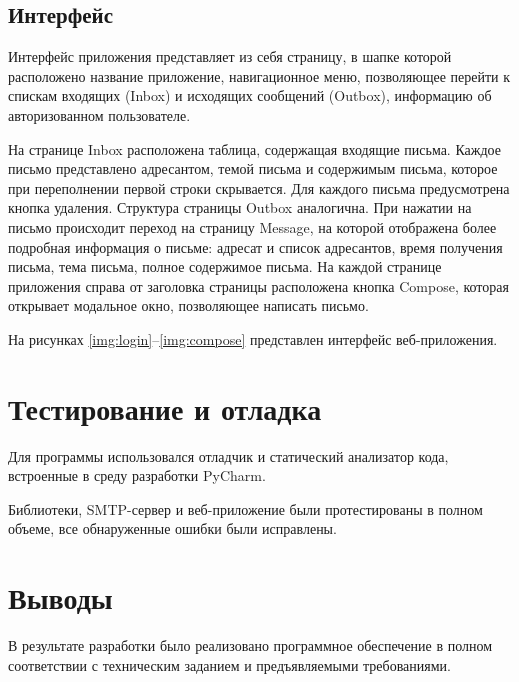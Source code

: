 \subsection{Интерфейс}

Интерфейс приложения представляет из себя страницу, в шапке которой расположено название приложение, навигационное меню, позволяющее перейти к спискам входящих (Inbox) и исходящих сообщений (Outbox), информацию об авторизованном пользователе.

На странице Inbox расположена таблица, содержащая входящие письма. Каждое письмо представлено адресантом, темой письма и содержимым письма, которое при переполнении первой строки скрывается. Для каждого письма предусмотрена кнопка удаления. Структура страницы Outbox аналогична. При нажатии на письмо происходит переход на страницу Message, на которой отображена более подробная информация о письме: адресат и список адресантов, время получения письма, тема письма, полное содержимое письма. На каждой странице приложения справа от заголовка страницы расположена кнопка Compose, которая открывает модальное окно, позволяющее написать письмо.

На рисунках \ref{img:login}--\ref{img:compose} представлен интерфейс веб-приложения.





\section{Тестирование и отладка}

Для программы использовался отладчик и статический анализатор кода, встроенные в среду разработки PyCharm.

Библиотеки, SMTP-сервер и веб-приложение были протестированы в полном объеме, все обнаруженные ошибки были исправлены.

\section{Выводы}

В результате разработки было реализовано программное обеспечение в полном соответствии с техническим заданием и предъявляемыми требованиями.